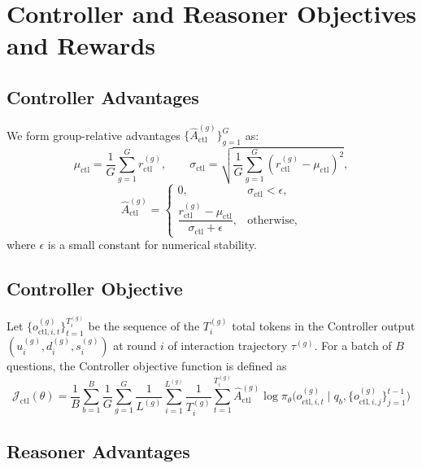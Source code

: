 
\section{Controller and Reasoner Objectives and Rewards}
\label{app:objectives}

\subsection{Controller Advantages}\label{app:controller_advantages}
We form group-relative advantages \cite{shao2024deepseekmath}
$\{\hat{A}_{\text{ctl}}^{(g)}\}_{g=1}^G$ as:
%
\begin{equation}
\mu_\text{ctl} = \frac{1}{G}\sum_{g=1}^{G} r_{\text{ctl}}^{(g)}, \qquad
\sigma_\text{ctl} = \sqrt{\frac{1}{G}\sum_{g=1}^{G}(r_{\text{ctl}}^{(g)} - \mu_\text{ctl})^2},
\end{equation}
\begin{equation}
\hat{A}_{\text{ctl}}^{(g)} =
\begin{cases}
0, & \sigma_\text{ctl} < \epsilon,\\[4pt]
\dfrac{r_{\text{ctl}}^{(g)} - \mu_\text{ctl}}{\sigma_\text{ctl} + \epsilon}, & \text{otherwise,}
\end{cases}
\end{equation}
%
where $\epsilon$ is a small constant for numerical stability.
\subsection{Controller Objective}
\label{app:controller_objective}
 
Let $\{o_{\text{ctl},i,t}^{(g)}\}_{t=1}^{T^{(g)}_i}$ be the sequence of the $T^{(g)}_i$ total tokens in the Controller output $(u_i^{(g)}, d_i^{(g)}, s_i^{(g)})$ at round $i$ of interaction trajectory $\tau^{(g)}$. For a batch of $B$ questions, the Controller objective function is defined as
\begin{equation}
\label{eq:controller_loss_app}
\mathcal{J}_{\text{ctl}}(\theta)
=
\frac{1}{B}\sum_{b=1}^{B}\frac{1}{G}\sum_{g=1}^{G} \frac{1}{L^{(g)}} \sum_{i=1}^{L^{(g)}} \frac{1}{T_i^{(g)}} \sum_{t=1}^{T_i^{(g)}} \hat{A}_{\text{ctl}}^{(g)} \log \pi_\theta\Big(o_{\text{ctl},i,t}^{(g)}\mid q_b, \{o_{\text{ctl},i,j}^{(g)}\}_{j=1}^{t-1}\Big)
\end{equation}

\subsection{Reasoner Advantages}\label{app:reasoner_advantages}

